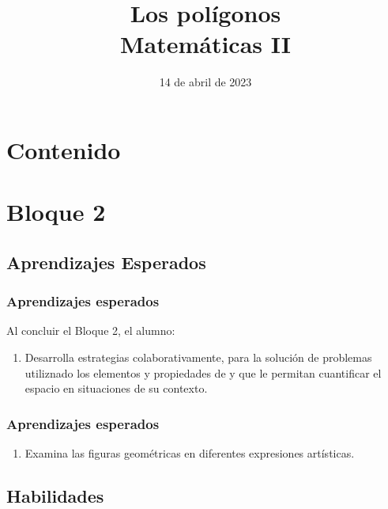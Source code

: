 \documentclass[14pt]{beamer}
\title{\Large{Los polígonos} \\ \normalsize{Matemáticas II}}
\date{14 de abril de 2023}
\begin{document}
\maketitle

\section*{Contenido}

\section{Bloque 2}
\subsection{Aprendizajes Esperados}

\begin{frame}
\frametitle{Aprendizajes esperados}
Al concluir el Bloque 2, el alumno:
\begin{enumerate}[<+->]
\item Desarrolla estrategias colaborativamente, para la solución de problemas utiliznado los elementos y propiedades de  y  que le permitan cuantificar el espacio en situaciones de su contexto.
\seti
\end{enumerate}
\end{frame}
\begin{frame}
\frametitle{Aprendizajes esperados}
\begin{enumerate}[<+->]
\conti
\item Examina las figuras geométricas en diferentes expresiones artísticas.
\end{enumerate}
\end{frame}

\subsection{Habilidades}
\end{document}

